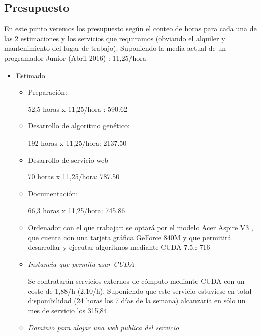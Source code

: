 \bigskip
\subsection{Presupuesto}
\bigskip


En este punto veremos los presupuesto según el conteo de horas para cada una de las 2 estimaciones y los servicios que requiramos (obviando el alquiler y mantenimiento del lugar de trabajo). Suponiendo la media actual de un programador Junior (Abril 2016) \cite{sueldos}: 11,25\officialeuro/hora


\bigskip
\begin{itemize}
	
	\item Estimado
	\begin{itemize}
		\item Preparación: 
		
		52,5 horas x 11,25\officialeuro/hora : 590.62\officialeuro
		
		\item Desarrollo de algoritmo genético: 
		
		192 horas x 11,25\officialeuro/hora: 2137.50\officialeuro
		
		\item Desarrollo de servicio web
		
		70 horas x 11,25\officialeuro/hora: 787.50\officialeuro
		
		\item Documentación: 

		66,3 horas x 11,25\officialeuro/hora: 745.86\officialeuro
		
		\item Ordenador con el que trabajar: se optará por el modelo Acer Aspire V3 \cite{aceraspire}, que cuenta con una tarjeta gráfica GeForce 840M \cite{geforce840m} y que permitirá desarrollar y ejecutar algoritmos mediante CUDA 7.5.:  716\officialeuro
		
		\item \textit{Instancia que permita usar CUDA}
		
		Se contratarán servicios externos de cómputo mediante CUDA \cite{amazoncuda} con un coste de 1,88\officialeuro/h (2,10\textdollar/h). Suponiendo que este servicio estuviese en total disponibilidad (24 horas los 7 días de la semana) alcanzaría en sólo un mes de servicio los 315,84\officialeuro.
		
		\item \textit{Dominio para alojar una web publica del servicio}
		

\end{itemize}
\end{itemize}
